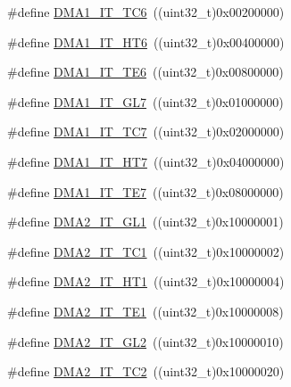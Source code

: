 \begin{DoxyCompactItemize}
\item 
\#define \hyperlink{group___d_m_a__interrupts__definition_ga466bad6bf0a2c115aee96d2a1e3b8ddf}{D\+M\+A1\+\_\+\+I\+T\+\_\+\+T\+C6}~((uint32\+\_\+t)0x00200000)
\item 
\#define \hyperlink{group___d_m_a__interrupts__definition_ga0a86890a8aa84b5c4f12f1684850fa91}{D\+M\+A1\+\_\+\+I\+T\+\_\+\+H\+T6}~((uint32\+\_\+t)0x00400000)
\item 
\#define \hyperlink{group___d_m_a__interrupts__definition_ga2bbf515c1154a5ad359cbd0ace724e64}{D\+M\+A1\+\_\+\+I\+T\+\_\+\+T\+E6}~((uint32\+\_\+t)0x00800000)
\item 
\#define \hyperlink{group___d_m_a__interrupts__definition_ga3df39a2f922a5f33ebf1ba3f1adfc15d}{D\+M\+A1\+\_\+\+I\+T\+\_\+\+G\+L7}~((uint32\+\_\+t)0x01000000)
\item 
\#define \hyperlink{group___d_m_a__interrupts__definition_ga17efb3180f536c295853e64e5ca508c2}{D\+M\+A1\+\_\+\+I\+T\+\_\+\+T\+C7}~((uint32\+\_\+t)0x02000000)
\item 
\#define \hyperlink{group___d_m_a__interrupts__definition_ga9f8a6dd7fc4978c95cbd9de63c85bc37}{D\+M\+A1\+\_\+\+I\+T\+\_\+\+H\+T7}~((uint32\+\_\+t)0x04000000)
\item 
\#define \hyperlink{group___d_m_a__interrupts__definition_ga1261e2bfa461a8097603b7737eb7698c}{D\+M\+A1\+\_\+\+I\+T\+\_\+\+T\+E7}~((uint32\+\_\+t)0x08000000)
\item 
\#define \hyperlink{group___d_m_a__interrupts__definition_gafe096e037c0b7cc498cdb993d32e06c5}{D\+M\+A2\+\_\+\+I\+T\+\_\+\+G\+L1}~((uint32\+\_\+t)0x10000001)
\item 
\#define \hyperlink{group___d_m_a__interrupts__definition_ga2b6a86186eb56749032aa18b9baff850}{D\+M\+A2\+\_\+\+I\+T\+\_\+\+T\+C1}~((uint32\+\_\+t)0x10000002)
\item 
\#define \hyperlink{group___d_m_a__interrupts__definition_gab9544576514917f9a1fcbb3100c3c2ae}{D\+M\+A2\+\_\+\+I\+T\+\_\+\+H\+T1}~((uint32\+\_\+t)0x10000004)
\item 
\#define \hyperlink{group___d_m_a__interrupts__definition_ga912b0a1e7104dc70d25ca1a33338b6eb}{D\+M\+A2\+\_\+\+I\+T\+\_\+\+T\+E1}~((uint32\+\_\+t)0x10000008)
\item 
\#define \hyperlink{group___d_m_a__interrupts__definition_gad1b225f7053b88eeee62e5ed1801b5c3}{D\+M\+A2\+\_\+\+I\+T\+\_\+\+G\+L2}~((uint32\+\_\+t)0x10000010)
\item 
\#define \hyperlink{group___d_m_a__interrupts__definition_ga174df6fdfa25046c1481ede66ff1eb6d}{D\+M\+A2\+\_\+\+I\+T\+\_\+\+T\+C2}~((uint32\+\_\+t)0x10000020)

\end{DoxyCompactItemize}

